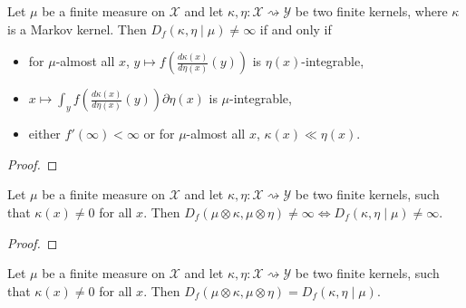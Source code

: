 \begin{lemma}
  \label{lem:condFDiv_ne_top_iff}
  \leanok
  Let $\mu$ be a finite measure on $\mathcal X$ and let $\kappa, \eta : \mathcal X \rightsquigarrow \mathcal Y$ be two finite kernels, where $\kappa$ is a Markov kernel.
  Then $D_f(\kappa, \eta \mid \mu) \ne \infty$ if and only if
  \begin{itemize}
    \item for $\mu$-almost all $x$, $y \mapsto f \left( \frac{d\kappa(x)}{d\eta(x)}(y) \right)$ is $\eta(x)$-integrable,
    \item $x \mapsto \int_y f \left( \frac{d\kappa(x)}{d\eta(x)}(y) \right) \partial \eta(x)$ is $\mu$-integrable,
    \item either $f'(\infty) < \infty$ or for $\mu$-almost all $x$, $\kappa(x) \ll \eta(x)$.
  \end{itemize}
\end{lemma}

\begin{proof} \leanok
{}
\end{proof}


\begin{lemma}
  \label{lem:fDiv_compProd_ne_top_iff}
  \leanok
  Let $\mu$ be a finite measure on $\mathcal X$ and let $\kappa, \eta : \mathcal X \rightsquigarrow \mathcal Y$ be two finite kernels, such that $\kappa(x) \ne 0$ for all $x$.
  Then $D_f(\mu \otimes \kappa, \mu \otimes \eta) \ne \infty \iff D_f(\kappa, \eta \mid \mu) \ne \infty$.
\end{lemma}

\begin{proof} \leanok
{}
\end{proof}


\begin{lemma}
  \label{lem:fDiv_compProd_left}
  \leanok
  Let $\mu$ be a finite measure on $\mathcal X$ and let $\kappa, \eta : \mathcal X \rightsquigarrow \mathcal Y$ be two finite kernels, such that $\kappa(x) \ne 0$ for all $x$.
  Then $D_f(\mu \otimes \kappa, \mu \otimes \eta) = D_f(\kappa, \eta \mid \mu)$.
\end{lemma}

